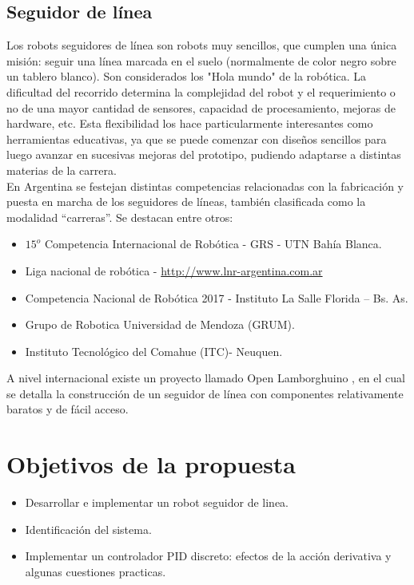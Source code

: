 \documentclass[10pt,conference,a4paper,onecolumn]{article}%
\begin{document}
 \subsection{Seguidor de línea}
 Los robots seguidores de línea son robots muy sencillos, que cumplen una única misión: seguir una línea marcada en el suelo (normalmente de color negro sobre un tablero blanco). Son considerados los "Hola mundo" de la robótica. La dificultad del recorrido determina la complejidad del robot y el requerimiento o no de una mayor cantidad de sensores, capacidad de procesamiento, mejoras de hardware, etc. Esta flexibilidad los hace particularmente interesantes como herramientas educativas, ya que se puede comenzar con diseños sencillos para luego avanzar en sucesivas mejoras del prototipo, pudiendo adaptarse a distintas materias de
la carrera.\\
En Argentina se festejan distintas competencias relacionadas con la fabricación y puesta en marcha de los seguidores de líneas, también clasificada como la modalidad “carreras”. Se destacan entre otros:
\begin{itemize}
\item $15^o$ Competencia Internacional de Robótica - GRS - UTN Bahía Blanca.
\item Liga nacional de robótica - \url{http://www.lnr-argentina.com.ar}
\item Competencia Nacional de Robótica 2017 - Instituto La Salle Florida – Bs. As.
\item Grupo de Robotica Universidad de Mendoza (GRUM).
\item Instituto Tecnológico del Comahue (ITC)- Neuquen.
\end{itemize}
A nivel internacional existe un proyecto llamado Open Lamborghuino \cite{lambo}, en el cual se detalla la construcción
de un seguidor de línea con componentes relativamente baratos y de fácil acceso.

\section{Objetivos de la propuesta}
\label{objetivos}
\begin{itemize}
\item Desarrollar e implementar un robot seguidor de linea.
\item Identificación del sistema.
\item {\color{red}Implementar un controlador PID discreto: efectos de la acción derivativa y algunas cuestiones practicas.}

\end{itemize}
\end{document}
